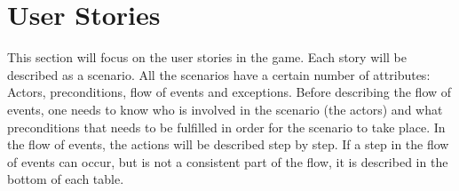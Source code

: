 \section{User Stories}

This section will focus on the user stories in the game. Each story will be described as a scenario. All the scenarios have a certain number of attributes: Actors, preconditions, flow of events and exceptions. Before describing the flow of events, one needs to know who is involved in the scenario (the actors) and what preconditions that needs to be fulfilled in order for the scenario to take place. In the flow of events, the actions will be described step by step. If a step in the flow of events can occur, but is not a consistent part of the flow, it is described in the bottom of each table.\\


